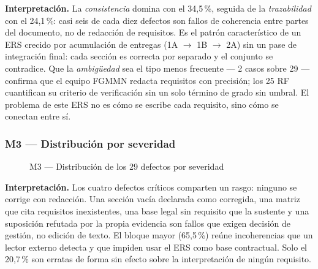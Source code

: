 \documentclass[11pt,letterpaper]{article}
\begin{document}
\textbf{Interpretación.} La \emph{consistencia} domina con el 34,5\,\%, seguida de la \emph{trazabilidad} con el 24,1\,\%: casi seis de cada diez defectos son fallos de coherencia entre partes del documento, no de redacción de requisitos. Es el patrón característico de un ERS crecido por acumulación de entregas (1A $\rightarrow$ 1B $\rightarrow$ 2A) sin un pase de integración final: cada sección es correcta por separado y el conjunto se contradice. Que la \emph{ambigüedad} sea el tipo menos frecuente --- 2 casos sobre 29 --- confirma que el equipo FGMMN redacta requisitos con precisión; los 25 RF cuantifican su criterio de verificación sin un solo término de grado sin umbral. El problema de este ERS no es cómo se escribe cada requisito, sino cómo se conectan entre sí.

\subsubsection*{M3 --- Distribución por severidad}
\begin{figure}[H]
\centering
{}
\caption{M3 --- Distribución de los 29 defectos por severidad}
\end{figure}

\textbf{Interpretación.} Los cuatro defectos críticos comparten un rasgo: ninguno se corrige con redacción. Una sección vacía declarada como corregida, una matriz que cita requisitos inexistentes, una base legal sin requisito que la sustente y una suposición refutada por la propia evidencia son fallos que exigen decisión de gestión, no edición de texto. El bloque mayor (65,5\,\%) reúne incoherencias que un lector externo detecta y que impiden usar el ERS como base contractual. Solo el 20,7\,\% son erratas de forma sin efecto sobre la interpretación de ningún requisito.
\end{document}
